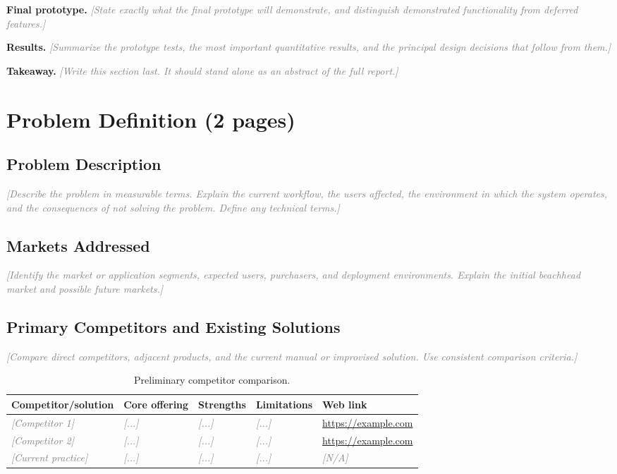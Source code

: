 \documentclass[11pt,letterpaper]{article}
\newcommand{\placeholder}[1]{\textcolor{gray}{\textit{[#1]}}}
\begin{document}
\textbf{Final prototype.} \placeholder{State exactly what the final prototype
will demonstrate, and distinguish demonstrated functionality from deferred
features.}

\textbf{Results.} \placeholder{Summarize the prototype tests, the most important
quantitative results, and the principal design decisions that follow from them.}

\textbf{Takeaway.} \placeholder{Write this section last. It should stand alone as
an abstract of the full report.}

\clearpage

\section{Problem Definition (2 pages)}
\subsection{Problem Description}
\placeholder{Describe the problem in measurable terms. Explain the current
workflow, the users affected, the environment in which the system operates,
and the consequences of not solving the problem. Define any technical terms.}

\subsection{Markets Addressed}
\placeholder{Identify the market or application segments, expected users,
purchasers, and deployment environments. Explain the initial beachhead market
and possible future markets.}

\subsection{Primary Competitors and Existing Solutions}
\placeholder{Compare direct competitors, adjacent products, and the current
manual or improvised solution. Use consistent comparison criteria.}

\begin{table}[H]
\centering
\caption{Preliminary competitor comparison.}
\label{tab:competitors}
\begin{tabularx}{\textwidth}{lYYYY}
\toprule
\textbf{Competitor/solution} & \textbf{Core offering} & \textbf{Strengths} &
\textbf{Limitations} & \textbf{Web link} \\
\midrule
\placeholder{Competitor 1} & \placeholder{...} & \placeholder{...} &
\placeholder{...} & \url{https://example.com} \\
\placeholder{Competitor 2} & \placeholder{...} & \placeholder{...} &
\placeholder{...} & \url{https://example.com} \\
\placeholder{Current practice} & \placeholder{...} & \placeholder{...} &
\placeholder{...} & \placeholder{N/A} \\
\bottomrule
\end{tabularx}
\end{table}
\end{document}
